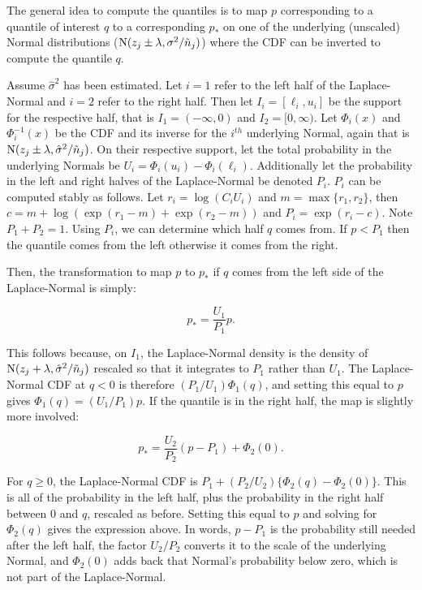 The general idea to compute the quantiles is to map $p$ corresponding to a quantile of interest $q$ to a corresponding $p_*$ on one of the underlying (unscaled) Normal distributions ($\textrm{N}(z_j \pm \lambda, \sigma^2 / \tilde{n}_j)$) where the CDF can be inverted to compute the quantile $q$.

Assume $\hat{\sigma}^2$ has been estimated. Let $i = 1$ refer to the left half of the Laplace-Normal and $i = 2$ refer to the right half. Then let $I_i = [\ell_i, u_i]$ be the support for the respective half, that is $I_1=(-\infty,0)$ and $I_2=[0,\infty)$. Let $\Phi_i(x)$ and $\Phi_i^{-1}(x)$ be the CDF and its inverse for the $i^{th}$ underlying Normal, again that is $\textrm{N}(z_j \pm \lambda, \hat{\sigma}^2 / \tilde{n}_j)$. On their respective support, let the total probability in the underlying Normals be $U_i = \Phi_i(u_i) - \Phi_i(\ell_i)$. Additionally let the probability in the left and right halves of the Laplace-Normal be denoted $P_i$. $P_i$ can be computed stably as follows. Let $r_i = \log(C_iU_i)$ and $m = \max\{r_1, r_2\}$, then $c = m + \log(\exp(r_1 - m) + \exp(r_2 - m))$ and $P_i = \exp(r_i - c)$. Note $P_1 + P_2 = 1$. Using $P_i$, we can determine which half $q$ comes from. If $p < P_1$ then the quantile comes from the left otherwise it comes from the right.

Then, the transformation to map $p$ to $p_*$ if $q$ comes from the left side of the Laplace-Normal is simply: 

$$
p_* = \frac{U_{1}}{P_{1}}p.
$$

This follows because, on $I_1$, the Laplace-Normal density is the density of $\textrm{N}(z_j + \lambda, \hat{\sigma}^2/\tilde{n}_j)$ rescaled so that it integrates to $P_1$ rather than $U_1$. The Laplace-Normal CDF at $q < 0$ is therefore $(P_1/U_1) \Phi_1(q)$, and setting this equal to $p$ gives $\Phi_1(q) = (U_1/P_1) p$. If the quantile is in the right half, the map is slightly more involved:

$$
p_* = \frac{U_{2}}{P_{2}} (p - P_1) + \Phi_{2}(0).
$$

For $q \ge 0$, the Laplace-Normal CDF is $P_1 + (P_2/U_2)\{\Phi_2(q) - \Phi_2(0)\}$. This is all of the probability in the left half, plus the probability in the right half between 0 and $q$, rescaled as before. Setting this equal to $p$ and solving for $\Phi_2(q)$ gives the expression above. In words, $p - P_1$ is the probability still needed after the left half, the factor $U_2/P_2$ converts it to the scale of the underlying Normal, and $\Phi_2(0)$ adds back that Normal's probability below zero, which is not part of the Laplace-Normal.

